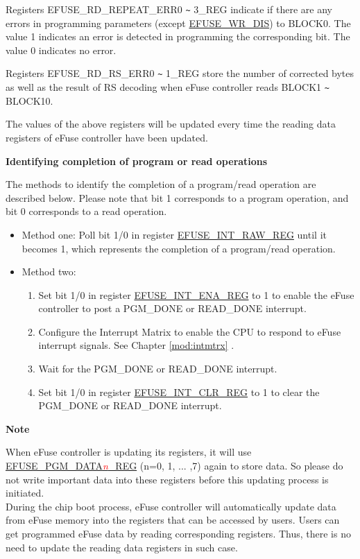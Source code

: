\documentclass[main\_\_EN.tex]{subfiles}
\begin{document}
Registers EFUSE\_RD\_REPEAT\_ERR0 \verb+~+ 3\_REG indicate if there are any errors in programming parameters (except \hyperref[fielddesc:EFUSEWRDIS]{EFUSE\_WR\_DIS}) to BLOCK0. The value 1 indicates an error is detected in programming the corresponding bit. The value 0 indicates no error. 

Registers EFUSE\_RD\_RS\_ERR0 \verb+~+ 1\_REG store the number of corrected bytes as well as the result of RS decoding when eFuse controller reads BLOCK1 \verb+~+ BLOCK10. 

The values of the above registers will be updated every time the reading data registers of eFuse controller have been updated.

{\bfseries Identifying completion of program or read operations}

The methods to identify the completion of a program/read operation are described below. Please note that bit 1 corresponds to a program operation, and bit 0 corresponds to a read operation.
\begin{itemize}
    \item Method one: Poll bit 1/0 in register \hyperref[regdesc:EFUSEINTRAWREG]{EFUSE\_INT\_RAW\_REG} until it becomes 1, which represents the completion of a program/read operation.
    \item Method two:
        \begin{enumerate}
            \item Set bit 1/0 in register \hyperref[regdesc:EFUSEINTENAREG]{EFUSE\_INT\_ENA\_REG} to 1 to enable the eFuse controller to post a PGM\_DONE or READ\_DONE interrupt.
            \item Configure the Interrupt Matrix to enable the CPU to respond to eFuse interrupt signals. See Chapter \ref{mod:intmtrx} \textit{}.
            \item Wait for the PGM\_DONE or READ\_DONE interrupt.
            \item Set bit 1/0 in register \hyperref[regdesc:EFUSEINTCLRREG]{EFUSE\_INT\_CLR\_REG} to 1 to clear the PGM\_DONE or READ\_DONE interrupt.
    \end{enumerate}
\end{itemize}

{\bfseries Note}

When eFuse controller is updating its registers, it will use \hyperref[regdesc:EFUSEPGMDATANREG]{EFUSE\_PGM\_DATA\textcolor{red}{\it{n}}\_REG} (n=0, 1, ... ,7) again to store data. So please do not write important data into these registers before this updating process is initiated. \\
During the chip boot process, eFuse controller will automatically update data from eFuse memory into the registers that can be accessed by users. Users can get programmed eFuse data by reading corresponding registers. Thus, there is no need to update the reading data registers in such case.
\end{document}
